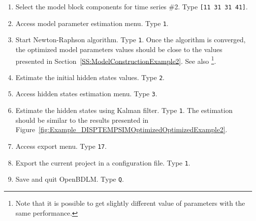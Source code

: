 \begin{enumerate}
\item Select the model block components for time series \#2. Type \colorbox{light-gray}{\lstinline[basicstyle = \mlttfamily \small, backgroundcolor = \color{light-gray}]![11 31 31 41]!}.
\item Access model parameter estimation menu. Type \colorbox{light-gray}{\lstinline[basicstyle = \mlttfamily \small, backgroundcolor = \color{light-gray}]!1!}. 
\item Start Newton-Raphson algorithm. Type \colorbox{light-gray}{\lstinline[basicstyle = \mlttfamily \small, backgroundcolor = \color{light-gray}]!1!}. Once the algorithm is converged, the optimized model parameters values should be close to the values presented in Section~\ref{SS:ModelConstructionExample2}. See also \footnote{Note that it is possible to get slightly different value of parameters with the same performance.}.
\item Estimate the initial hidden states values. Type \colorbox{light-gray}{\lstinline[basicstyle = \mlttfamily \small, backgroundcolor = \color{light-gray}]!2!}.
\item Access hidden states estimation menu. Type \colorbox{light-gray}{\lstinline[basicstyle = \mlttfamily \small, backgroundcolor = \color{light-gray}]!3!}. 
\item Estimate the hidden states using Kalman filter. Type \colorbox{light-gray}{\lstinline[basicstyle = \mlttfamily \small, backgroundcolor = \color{light-gray}]!1!}. The estimation should be similar to the results presented in Figure~\ref{fig:Example_DISPTEMPSIMOptimizedOptimizedExample2}.
\item Access export menu. Type \colorbox{light-gray}{\lstinline[basicstyle = \mlttfamily \small, backgroundcolor = \color{light-gray}]!17!}. 
\item Export the current project in a configuration file. Type \colorbox{light-gray}{\lstinline[basicstyle = \mlttfamily \small, backgroundcolor = \color{light-gray}]!1!}.
\item Save and quit OpenBDLM. Type \colorbox{light-gray}{\lstinline[basicstyle = \mlttfamily \small, backgroundcolor = \color{light-gray}]!Q!}.
\end{enumerate}





